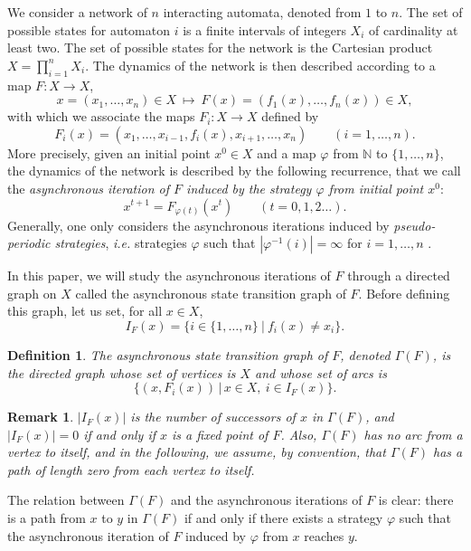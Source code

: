 \documentclass[11pt]{article}
\newtheorem{definition}{Definition}
\newtheorem{remark}{Remark}
\def\N{\mathbb{N}}
\def\1n{1,\dots,n}
\def\phi{\varphi}
\begin{document}
We consider a network of $n$ interacting automata, denoted from $1$ to
$n$. The set of possible states for automaton $i$ is a finite
intervals of integers $X_i$ of cardinality at least two. The set of
possible states for the network is the Cartesian product
$X=\prod_{i=1}^n X_i$. The dynamics of the network is then described
according to a map $F:X\to X$,
\[
x=(x_1,\dots,x_n)\in X~\mapsto~ F(x)=(f_1(x),\dots,f_n(x))\in X,
\]
with which we associate the maps $F_i:X\to X$ defined by
\[
F_i(x)=(x_1,\dots,x_{i-1},f_i(x),x_{i+1},\dots,x_n)\qquad (i=\1n).
\]
More precisely, given an initial point $x^0\in X$ and a map $\phi$
from $\N$ to $\{\1n\}$, the dynamics of the network is described by
the following recurrence, that we call the {\emph{asynchronous
iteration of $F$ induced by the strategy $\phi$ from initial point
$x^0$}}:
\begin{equation}\label{it}
x^{t+1}=F_{\phi(t)}(x^t)\qquad (t=0,1,2\dots). 
\end{equation}
Generally, one only considers the asynchronous iterations induced by
{\emph{pseudo-periodic strategies}}, {\emph{i.e.}} strategies $\phi$
such that $|\phi^{-1}(i)|=\infty$ for $i=\1n$ {\cite{R95,BM00}}.

In this paper, we will study the asynchronous iterations of $F$
through a directed graph on $X$ called the asynchronous state
transition graph of $F$. Before defining this graph, let us set, for
all $x\in X$,
\[
I_F(x)=\{i\in\{\1n\}~|~f_i(x)\neq x_i\}.
\]

\begin{definition}
The {\emph{asynchronous state transition graph of $F$}}, denoted
$\Gamma(F)$, is the directed graph whose set of vertices is $X$ and
whose set of arcs is
\[
\{(x,F_i(x))\,|\, x\in X,~i\in I_F(x)\}.
\]
\end{definition}


\begin{remark}
{\emph{$|I_F(x)|$ is the number of successors of $x$ in $\Gamma(F)$,
and $|I_F(x)|=0$ if and only if $x$ is a fixed point of $F$. Also,
$\Gamma(F)$ has no arc from a vertex to itself, and in the following,
we assume, by convention, that $\Gamma(F)$ has a path of length zero
from each vertex to itself.}}
\end{remark}
The relation between $\Gamma(F)$ and the asynchronous iterations of
$F$ is clear: there is a path from $x$ to $y$ in $\Gamma(F)$ if and
only if there exists a strategy $\phi$ such that the asynchronous
iteration of $F$ induced by $\phi$ from $x$ reaches $y$.
\end{document}
